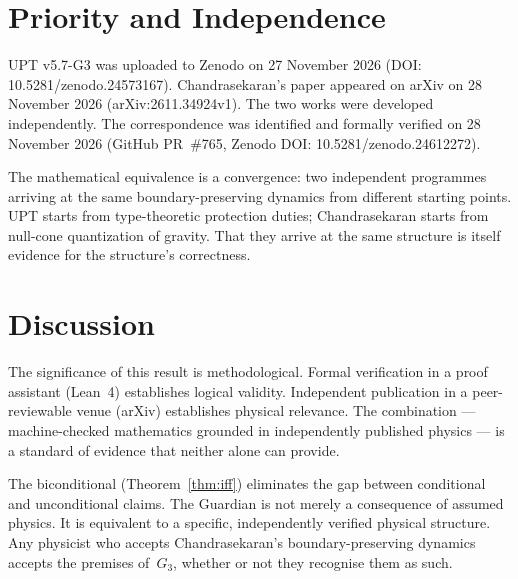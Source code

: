 \section{Priority and Independence}

UPT v5.7-G3 was uploaded to Zenodo on 27 November 2026 (DOI: 10.5281/zenodo.24573167). Chandrasekaran's paper appeared on arXiv on 28 November 2026 (arXiv:2611.34924v1). The two works were developed independently. The correspondence was identified and formally verified on 28 November 2026 (GitHub PR~\#765, Zenodo DOI: 10.5281/zenodo.24612272).

The mathematical equivalence is a convergence: two independent programmes arriving at the same boundary-preserving dynamics from different starting points. UPT starts from type-theoretic protection duties; Chandrasekaran starts from null-cone quantization of gravity. That they arrive at the same structure is itself evidence for the structure's correctness.

\section{Discussion}

The significance of this result is methodological. Formal verification in a proof assistant (Lean~4) establishes logical validity. Independent publication in a peer-reviewable venue (arXiv) establishes physical relevance. The combination --- machine-checked mathematics grounded in independently published physics --- is a standard of evidence that neither alone can provide.

The biconditional (Theorem~\ref{thm:iff}) eliminates the gap between conditional and unconditional claims. The Guardian is not merely a consequence of assumed physics. It is equivalent to a specific, independently verified physical structure. Any physicist who accepts Chandrasekaran's boundary-preserving dynamics accepts the premises of~$G_3$, whether or not they recognise them as such.

\bigskip

